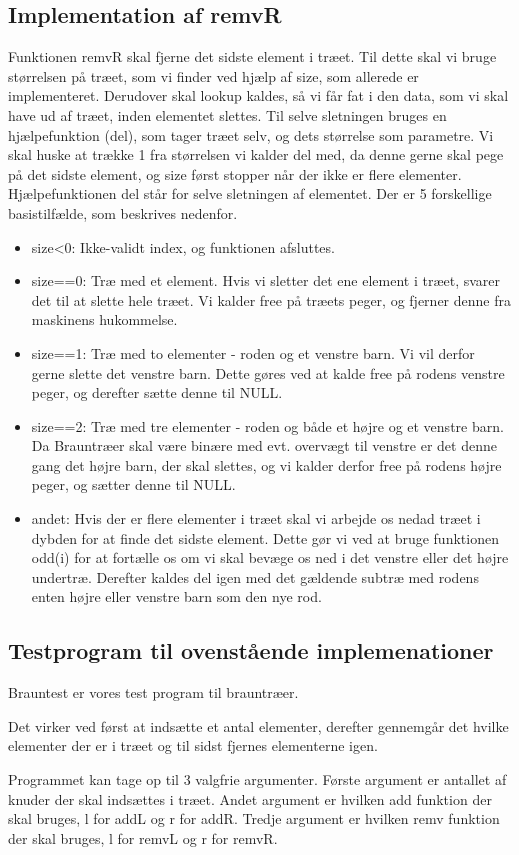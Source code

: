 \documentclass[10pt,a4paper,danish]{article}
\begin{document}
\subsection{Implementation af remvR}
Funktionen remvR skal fjerne det sidste element i træet. Til dette skal vi bruge størrelsen på træet, som vi finder ved hjælp af size, som allerede er implementeret. Derudover skal lookup kaldes, så vi får fat i den data, som vi skal have ud af træet, inden elementet slettes. Til selve sletningen bruges en hjælpefunktion (del), som tager træet selv, og dets størrelse som parametre. Vi skal huske at trække 1 fra størrelsen vi kalder del med, da denne gerne skal pege på det sidste element, og size først stopper når der ikke er flere elementer.\\

Hjælpefunktionen del står for selve sletningen af elementet. Der er 5 forskellige basistilfælde, som beskrives nedenfor. 

\begin{itemize}
\item size<0: Ikke-validt index, og funktionen afsluttes. 
\item size==0: Træ med et element. Hvis vi sletter det ene element i træet, svarer det til at slette hele træet. Vi kalder free på træets peger, og fjerner denne fra maskinens hukommelse. 
\item size==1: Træ med to elementer - roden og et venstre barn. Vi vil derfor gerne slette det venstre barn. Dette gøres ved at kalde free på rodens venstre peger, og derefter sætte denne til NULL.
\item size==2: Træ med tre elementer - roden og både et højre og et venstre barn. Da Brauntræer skal være binære med evt. overvægt til venstre er det denne gang det højre barn, der skal slettes, og vi kalder derfor free på rodens højre peger, og sætter denne til NULL.
\item andet: Hvis der er flere elementer i træet skal vi arbejde os nedad træet i dybden for at finde det sidste element. Dette gør vi ved at bruge funktionen odd(i) for at fortælle os om vi skal bevæge os ned i det venstre eller det højre undertræ. Derefter kaldes del igen med det gældende subtræ med rodens enten højre eller venstre barn som den nye rod.
\end{itemize}

\subsection{Testprogram til ovenstående implemenationer}

Brauntest er vores test program til brauntræer.

Det virker ved først at indsætte et antal elementer, derefter gennemgår det hvilke elementer der er i træet og til sidst fjernes elementerne igen.

Programmet kan tage op til 3 valgfrie argumenter.
Første argument er antallet af knuder der skal indsættes i træet.
Andet argument er hvilken add funktion der skal bruges, l for addL og r for addR.
Tredje argument er hvilken remv funktion der skal bruges, l for remvL og r for remvR.
\end{document}
